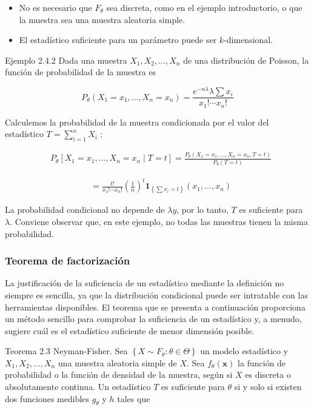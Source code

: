 \documentclass[
]{article}
\providecommand{\tightlist}{%
  \setlength{\itemsep}{0pt}\setlength{\parskip}{0pt}}
\begin{document}
\begin{itemize}
\tightlist
\item
  No es necesario que \(F_{\theta}\) sea discreta, como en el ejemplo introductorio, o que la muestra sea una muestra aleatoria simple.
\item
  El estadístico suficiente para un parámetro puede ser \(k\)-dimensional.
\end{itemize}

Ejemplo 2.4.2 Dada una muestra \(X_{1}, X_{2}, \ldots, X_{n}\) de una distribución de Poisson, la función de probabilidad de la muestra es

\[
P_{\theta}\left(X_{1}=x_{1}, \ldots, X_{n}=x_{n}\right)=\frac{e^{-n \lambda} \lambda \sum x_{i}}{x_{1}!\cdots x_{n}!}
\]

Calculemos la probabilidad de la muestra condicionada por el valor del estadístico \(T=\sum_{i=1}^{n} X_{i}\) :

\[
\begin{aligned}
& P_{\theta}\left[X_{1}=x_{1}, \ldots, X_{n}=x_{n} \mid T=t\right]=\frac{P_{\theta}\left(X_{1}=x_{1}, \ldots, X_{n}=x_{n}, T=t\right)}{P_{\theta}(T=t)}
\end{aligned}
\]

\[
\begin{aligned}
& =\frac{t!}{x_{1}!\cdots x_{n}!}\left(\frac{1}{n}\right)^{t} \mathbf{1}_{\left\{\sum x_{i}=t\right\}}\left(x_{1}, \ldots, x_{n}\right)
\end{aligned}
\]

La probabilidad condicional no depende de \(\lambda y\), por lo tanto, \(T\) es suficiente para \(\lambda\). Conviene observar que, en este ejemplo, no todas las muestras tienen la misma probabilidad.

\subsubsection{Teorema de factorización}\label{teorema-de-factorizaciuxf3n}

La justificación de la suficiencia de un estadístico mediante la definición no siempre es sencilla, ya que la distribución condicional puede ser intratable con las herramientas disponibles. El teorema que se presenta a continuación proporciona un método sencillo para comprobar la suficiencia de un estadístico y, a menudo, sugiere cuál es el estadístico suficiente de menor dimensión posible.

Teorema 2.3 Neyman-Fisher. Sea \(\left\{X \sim F_{\theta}: \theta \in \Theta\right\}\) un modelo estadístico y \(X_{1}, X_{2}, \ldots, X_{n}\) una muestra aleatoria simple de \(X\). Sea \(f_{\theta}(\mathbf{x})\) la función de probabilidad o la función de densidad de la muestra, según si \(X\) es discreta o absolutamente continua. Un estadístico \(T\) es suficiente para \(\theta\) si y solo si existen dos funciones medibles \(g_{\theta}\) y \(h\) tales que
\end{document}
